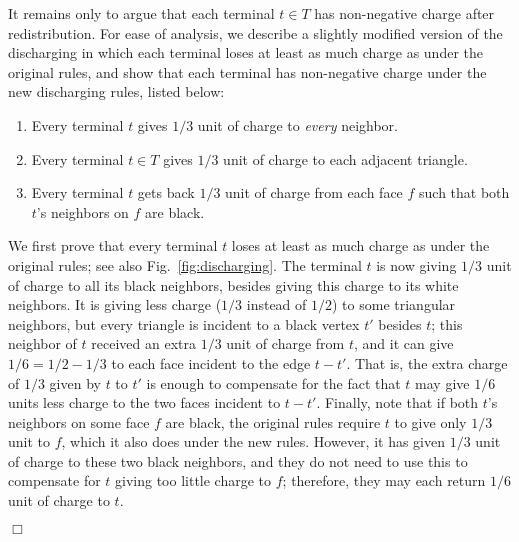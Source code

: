 \documentclass[11pt]{article}
\renewenvironment{proof}{\vspace{-0.1in}\noindent{\bf Proof:}}{\hspace*{\fill}$\Box$\par}
\begin{document}
\begin{proof}
  \bigskip It remains only to argue that each terminal $t \in T$ has
  non-negative charge after redistribution. For ease of analysis, we
  describe a slightly modified version of the discharging in which
  each terminal loses at least as much charge as under the original
  rules, and show that each terminal has non-negative charge under the
  new discharging rules, listed below:
  \begin{enumerate}
  \item Every terminal $t$ gives $1/3$ unit of charge to \emph{every}
    neighbor.

  \item Every terminal $t \in T$ gives $1/3$ unit of charge to each
    adjacent triangle.

  \item Every terminal $t$ gets back $1/3$ unit of charge from each face
    $f$ such that both $t$'s neighbors on $f$ are black.
  \end{enumerate}
  
  We first prove that every terminal $t$ loses at least as much charge
  as under the original rules; see also Fig.~\ref{fig:discharging}.
  The terminal $t$ is now giving $1/3$ unit of charge to all its black
  neighbors, besides giving this charge to its white neighbors. It is
  giving less charge ($1/3$ instead of $1/2$) to some triangular
  neighbors, but every triangle is incident to a black vertex $t'$
  besides $t$; this neighbor of $t$ received an extra $1/3$ unit of
  charge from $t$, and it can give $1/6 = 1/2-1/3$ to each face
  incident to the edge $t-t'$. That is, the extra charge of $1/3$
  given by $t$ to $t'$ is enough to compensate for the fact that $t$
  may give $1/6$ units less charge to the two faces incident to
  $t-t'$. Finally, note that if both $t$'s neighbors on some face $f$
  are black, the original rules require $t$ to give only $1/3$ unit to
  $f$, which it also does under the new rules. However, it has given
  $1/3$ unit of charge to these two black neighbors, and they do not
  need to use this to compensate for $t$ giving too little charge to
  $f$; therefore, they may each return $1/6$ unit of charge to $t$.

  \begin{figure}[h]
    \begin{center}
\end{center}
\end{figure}
\end{proof}
\end{document}
